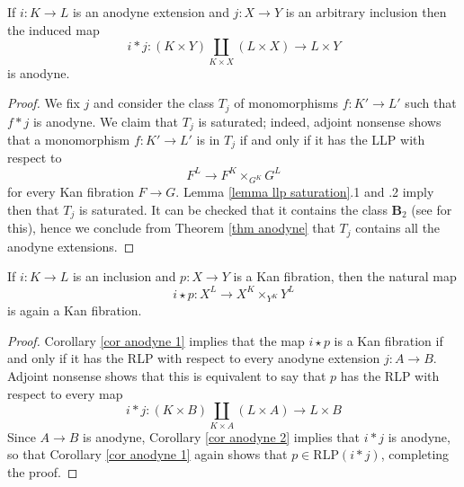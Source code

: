 \begin{refsection}
\begin{cor} \label{cor anodyne 2}
If $i \colon K \to L$ is an anodyne extension and $j \colon X \to Y$ is an arbitrary inclusion then the induced map
\[
i * j \colon (K \times Y) \coprod_{K \times X} (L \times X) \to L \times Y
\]
is anodyne.
\end{cor}

\begin{proof}
We fix $j$ and consider the class $T_j$ of monomorphisms $f \colon K' \to L'$ such that $f * j$ is anodyne. We claim that $T_j$ is saturated; indeed, adjoint nonsense shows that a monomorphism $f \colon K' \to L'$ is in $T_j$ if and only if it has the LLP with respect to
\[
F^L \to F^K \times_{G^K} G^L
\]
for every Kan fibration $F \to G$. Lemma \ref{lemma llp saturation}.1 and .2 imply then that $T_j$ is saturated. It can be checked that it contains the class $\mathbf B_2$ (see \cite[corollary I.4.6]{goerss-jardine-simplicial-homotopy-theory} for this), hence we conclude from Theorem \ref{thm anodyne} that $T_j$ contains all the anodyne extensions.
\end{proof}

\begin{cor} \label{cor anodyne 3}
If $i \colon K \to L$ is an inclusion and $p \colon X \to Y$ is a Kan fibration, then the natural map
\[
i \star p \colon X^L \to X^K \times_{Y^K} Y^L
\]
is again a Kan fibration.
\end{cor}

\begin{proof}
Corollary \ref{cor anodyne 1} implies that the map $i \star p$ is a Kan fibration if and only if it has the RLP with respect to every anodyne extension $j \colon A \to B$. Adjoint nonsense shows that this is equivalent to say that $p$ has the RLP with respect to every map
\[
i * j \colon (K \times B) \coprod_{K \times A} (L \times A) \to L \times B
\]
Since $A \to B$ is anodyne, Corollary \ref{cor anodyne 2} implies that $i * j$ is anodyne, so that Corollary \ref{cor anodyne 1} again shows that $p \in \mathrm{RLP}(i * j)$, completing the proof.
\end{proof}

\printbibliography[heading = local]

\end{refsection}
